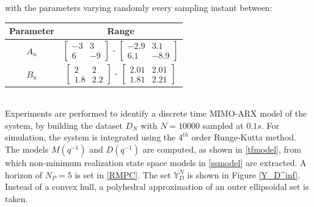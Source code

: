 \documentclass[letterpaper, 10 pt, conference]{ieeeconf}  %
\begin{document}
with the parameters varying randomly every sampling instant between:
\begin{table}[h!]
	\hspace{50pt}
	\begin{tabular}{||c|c||} 
		\hline
		Parameter & Range \vspace{1pt}\\ [0.5ex] 
		\hline
		$A_u$ & $\begin{bmatrix} -3 & 3 \\ 6 & -9 \end{bmatrix}$ - 
		$\begin{bmatrix} -2.9 & 3.1 \\ 6.1 & -8.9 \end{bmatrix}$  \vspace{1pt}\\
		$B_u$ & $\begin{bmatrix} 2 & 2 \\ 1.8 & 2.2 \end{bmatrix}$ - 
		$\begin{bmatrix} 2.01 & 2.01 \\ 1.81 & 2.21 \end{bmatrix}$  \\
		\hline
	\end{tabular}
	\label{Simparam}
	\vspace{-10pt}  
\end{table}
\\
Experiments are performed to identify a discrete time MIMO-ARX model of the system, by building the dataset $D_N$ with $N=10000$ sampled at $0.1s$. For simulation, the system is integrated using the $4^{th}$ order Runge-Kutta method.
The models $M(q^{-1})$ and $D(q^{-1})$ are computed, as shown in \eqref{tfmodel}, from which non-minimum realization state space models in \eqref{ssmodel} are extracted. A horizon of $N_P=5$ is set in \eqref{RMPC}. The set $\mathbb{Y}_D^{N}$ is shown in Figure \ref{Y_D^inf}. Instead of a convex hull, a polyhedral approximation of an outer ellipsoidal set is taken. 
\end{document}
